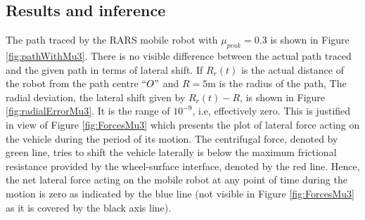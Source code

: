 \subsection{Results and inference}
The path traced by the RARS mobile robot  with  $\mu_{peak} =0.3$ is shown in Figure \ref{fig:pathWithMu3}. There is no visible difference between the  actual path traced  and the given path in terms of lateral shift. If $R_r(t)$ is the actual distance of the robot from the path centre $``O"$ and $R=5$m is the radius of the path, The radial deviation,  the lateral shift given by  $ R_r(t)-R$, is shown in Figure \ref{fig:radialErrorMu3}. It is the range of $10^{-9}$, i.e, effectively zero.    This is justified in view of Figure \ref{fig:ForcesMu3} which presents the plot of lateral force acting on the vehicle during the period of its motion. The centrifugal force, denoted by green line,  tries to shift the vehicle laterally is below the maximum frictional resistance provided by the wheel-surface interface, denoted by the red line. Hence, the net lateral force acting on the mobile robot at any point of time during the motion is zero as indicated by the blue line (not visible in Figure \ref{fig:ForcesMu3} as it is covered by the black axis line).

